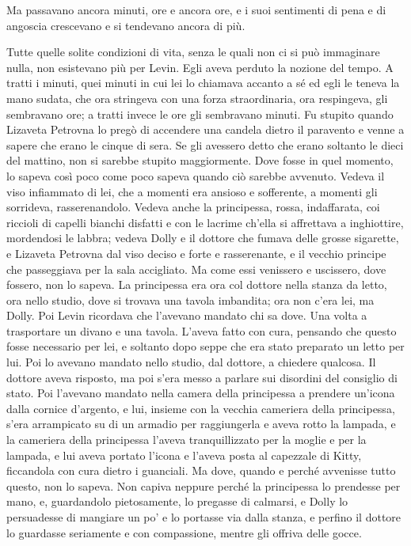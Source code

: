 Ma passavano ancora minuti, ore e ancora ore, e i suoi sentimenti di pena e di angoscia crescevano e si tendevano ancora di più. 

Tutte quelle solite condizioni di vita, senza le quali non ci si può immaginare nulla, non esistevano più per Levin. Egli aveva perduto la nozione del tempo. A tratti i minuti, quei minuti in cui lei lo chiamava accanto a sé ed egli le teneva la mano sudata, che ora stringeva con una forza straordinaria, ora respingeva, gli sembravano ore; a tratti invece le ore gli sembravano minuti. Fu stupito quando Lizaveta Petrovna lo pregò di accendere una candela dietro il paravento e venne a sapere che erano le cinque di sera. Se gli avessero detto che erano soltanto le dieci del mattino, non si sarebbe stupito maggiormente. Dove fosse in quel momento, lo sapeva così poco come poco sapeva quando ciò sarebbe avvenuto. Vedeva il viso infiammato di lei, che a momenti era ansioso e sofferente, a momenti gli sorrideva, rasserenandolo. Vedeva anche la principessa, rossa, indaffarata, coi riccioli di capelli bianchi disfatti e con le lacrime ch'ella si affrettava a inghiottire, mordendosi le labbra; vedeva Dolly e il dottore che fumava delle grosse sigarette, e Lizaveta Petrovna dal viso deciso e forte e rasserenante, e il vecchio principe che passeggiava per la sala accigliato. Ma come essi venissero e uscissero, dove fossero, non lo sapeva. La principessa era ora col dottore nella stanza da letto, ora nello studio, dove si trovava una tavola imbandita; ora non c'era lei, ma Dolly. Poi Levin ricordava che l'avevano mandato chi sa dove. Una volta a trasportare un divano e una tavola. L'aveva fatto con cura, pensando che questo fosse necessario per lei, e soltanto dopo seppe che era stato preparato un letto per lui. Poi lo avevano mandato nello studio, dal dottore, a chiedere qualcosa. Il dottore aveva risposto, ma poi s'era messo a parlare sui disordini del consiglio di stato. Poi l'avevano mandato nella camera della principessa a prendere un'icona dalla cornice d'argento, e lui, insieme con la vecchia cameriera della principessa, s'era arrampicato su di un armadio per raggiungerla e aveva rotto la lampada, e la cameriera della principessa l'aveva tranquillizzato per la moglie e per la lampada, e lui aveva portato l'icona e l'aveva posta al capezzale di Kitty, ficcandola con cura dietro i guanciali. Ma dove, quando e perché avvenisse tutto questo, non lo sapeva. Non capiva neppure perché la principessa lo prendesse per mano, e, guardandolo pietosamente, lo pregasse di calmarsi, e Dolly lo persuadesse di mangiare un po' e lo portasse via dalla stanza, e perfino il dottore lo guardasse seriamente e con compassione, mentre gli offriva delle gocce. 

